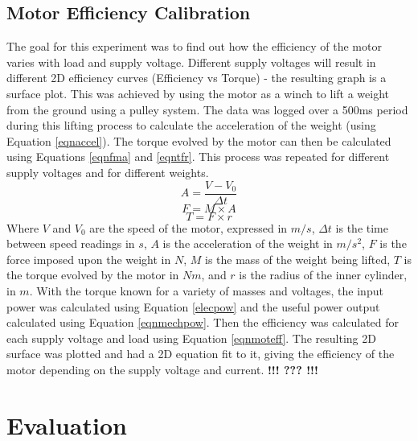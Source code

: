 \documentclass[twoside,a4]{report}
\def\br{\newline \newline \noindent}
\def\cbh{\large\bfseries !!! ??? !!! \normalsize\normalfont}
\begin{document}
	\subsection*{Motor Efficiency Calibration}
	The goal for this experiment was to find out how the efficiency of the motor varies with load and supply voltage. Different supply voltages will result in different 2D efficiency curves (Efficiency vs Torque) - the resulting graph is a surface plot. This was achieved by using the motor as a winch to lift a weight from the ground using a pulley system. The data was logged over a 500ms period during this lifting process to calculate the acceleration of the weight (using Equation \ref{eqnaccel}). The torque evolved by the motor can then be calculated using Equations \ref{eqnfma} and \ref{eqntfr}. This process was repeated for different supply voltages and for different weights.
	\begin{equation}
	A = \frac{V - V_0}{\Delta t}
	\label{eqnaccel}
	\end{equation}
	\begin{equation}
	F = M \times A
	\label{eqnfma}
	\end{equation}
	\begin{equation}
	T = F \times r
	\label{eqntfr}
	\end{equation}
	Where \(V\) and \(V_0\) are the speed of the motor, expressed in \(m/s\), \(\Delta t\) is the time between speed readings in \(s\), \(A\) is the acceleration of the weight in \(m/{s^2}\), \(F\) is the force imposed upon the weight in \(N\), \(M\) is the mass of the weight being lifted, \(T\) is the torque evolved by the motor in \(Nm\), and \(r\) is the radius of the inner cylinder, in \(m\).\br
	With the torque known for a variety of masses and voltages, the input power was calculated using Equation \ref{elecpow} and the useful power output calculated using Equation \ref{eqnmechpow}. Then the efficiency was calculated for each supply voltage and load using Equation \ref{eqnmoteff}. The resulting 2D surface was plotted and had a 2D equation fit to it, giving the efficiency of the motor depending on the supply voltage and current. \cbh %



	\section{Evaluation} %
	
\end{document}
